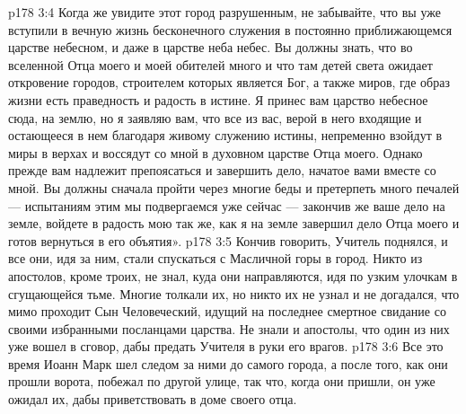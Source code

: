 \vs p178 3:4 Когда же увидите этот город разрушенным, не забывайте, что вы уже вступили в вечную жизнь бесконечного служения в постоянно приближающемся царстве небесном, и даже в царстве неба небес. Вы должны знать, что во вселенной Отца моего и моей обителей много и что там детей света ожидает откровение городов, строителем которых является Бог, а также миров, где образ жизни есть праведность и радость в истине. Я принес вам царство небесное сюда, на землю, но я заявляю вам, что все из вас, верой в него входящие и остающееся в нем благодаря живому служению истины, непременно взойдут в миры в верхах и воссядут со мной в духовном царстве Отца моего. Однако прежде вам надлежит препоясаться и завершить дело, начатое вами вместе со мной. Вы должны сначала пройти через многие беды и претерпеть много печалей --- испытаниям этим мы подвергаемся уже сейчас --- закончив же ваше дело на земле, войдете в радость мою так же, как я на земле завершил дело Отца моего и готов вернуться в его объятия».
\vs p178 3:5 \pc Кончив говорить, Учитель поднялся, и все они, идя за ним, стали спускаться с Масличной горы в город. Никто из апостолов, кроме троих, не знал, куда они направляются, идя по узким улочкам в сгущающейся тьме. Многие толкали их, но никто их не узнал и не догадался, что мимо проходит Сын Человеческий, идущий на последнее смертное свидание со своими избранными посланцами царства. Не знали и апостолы, что один из них уже вошел в сговор, дабы предать Учителя в руки его врагов.
\vs p178 3:6 Все это время Иоанн Марк шел следом за ними до самого города, а после того, как они прошли ворота, побежал по другой улице, так что, когда они пришли, он уже ожидал их, дабы приветствовать в доме своего отца.
